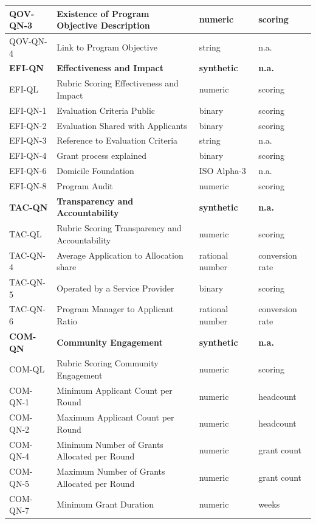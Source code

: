 \documentclass[a4,10pt]{article}
\begin{document}
\begin{table}[ht!]
\begin{tabular}{l|l|l|l}
QOV-QN-3 & Existence of Program Objective Description & numeric & scoring \\ \hline
QOV-QN-4 & Link to Program Objective & string & n.a. \\ \hline
\textbf{EFI-QN} & \textbf{Effectiveness and Impact} & \textbf{synthetic} & \textbf{n.a.} \\ \hline
EFI-QL & Rubric Scoring Effectiveness and Impact & numeric & scoring \\ \hline
EFI-QN-1 & Evaluation Criteria Public & binary & scoring \\ \hline
EFI-QN-2 & Evaluation Shared with Applicants & binary & scoring \\ \hline
EFI-QN-3 & Reference to Evaluation Criteria & string & n.a. \\ \hline
EFI-QN-4 & Grant process explained & binary & scoring \\ \hline
EFI-QN-6 & Domicile Foundation & ISO Alpha-3 & n.a. \\ \hline
EFI-QN-8 & Program Audit & numeric & scoring \\ \hline
\textbf{TAC-QN} & \textbf{Transparency and Accountability} & \textbf{synthetic} & \textbf{n.a.} \\ \hline
TAC-QL & Rubric Scoring Transparency and Accountability & numeric & scoring \\ \hline
TAC-QN-4 & Average Application to Allocation share & rational number & conversion rate \\ \hline
TAC-QN-5 & Operated by a Service Provider & binary & scoring \\ \hline
TAC-QN-6 & Program Manager to Applicant Ratio & rational number & conversion rate \\ \hline
\textbf{COM-QN} & \textbf{Community Engagement} & \textbf{synthetic} & \textbf{n.a.} \\ \hline
COM-QL & Rubric Scoring Community Engagement & numeric & scoring \\ \hline
COM-QN-1 & Minimum Applicant Count per Round & numeric & headcount \\ \hline
COM-QN-2 & Maximum Applicant Count per Round & numeric & headcount \\ \hline
COM-QN-4 & Minimum Number of Grants Allocated per Round & numeric & grant count \\ \hline
COM-QN-5 & Maximum Number of Grants Allocated per Round & numeric & grant count \\ \hline
COM-QN-7 & Minimum Grant Duration & numeric & weeks \\ \hline

\end{tabular}
\end{table}
\end{document}
